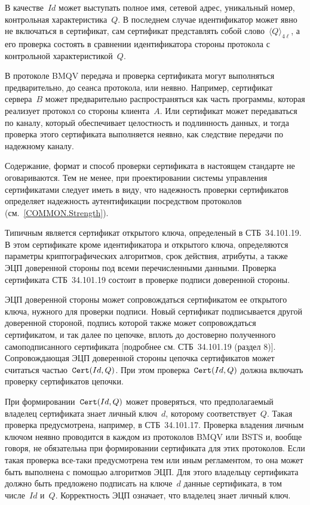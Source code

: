 \begin{note}
В качестве~$Id$ может выступать полное имя, сетевой адрес, уникальный номер,
контрольная характеристика~$Q$.
%
В последнем случае идентификатор может явно не включаться в сертификат, сам
сертификат представлять собой слово~$\langle Q\rangle_{4\ell}$, а его проверка
состоять в сравнении идентификатора стороны протокола с контрольной
характеристикой~$Q$.
\end{note}

В протоколе BMQV передача и проверка сертификата могут выполняться
предварительно, до сеанса протокола, или неявно.
%
Например, сертификат сервера~$B$ может предварительно распространяться как часть
программы, которая реализует протокол со стороны клиента~$A$.
%
Или сертификат может передаваться по каналу, который обеспечивает целостность и
подлинность данных, и тогда проверка этого сертификата выполняется неявно, как
следствие передачи по надежному каналу.

Содержание, формат и способ проверки сертификата в настоящем стандарте не
оговариваются.
%
Тем не менее, при проектировании системы управления сертификатами следует иметь
в виду, что надежность проверки сертификатов определяет надежность
аутентификации посредством протоколов (см.~\ref{COMMON.Strength}).

Типичным является сертификат открытого ключа, определеный в СТБ~34.101.19. В
этом сертификате кроме идентификатора и открытого ключа, определяются параметры
криптографических алгоритмов, срок действия, атрибуты, а также ЭЦП доверенной
стороны под всеми перечисленными данными.
%
Проверка сертификата СТБ~34.101.19 состоит в проверке подписи доверенной
стороны.

\begin{note}
ЭЦП доверенной стороны может сопровождаться 
сертификатом ее открытого ключа, нужного для проверки 
подписи. Новый сертификат подписывается другой
доверенной стороной, подпись которой также может сопровождаться 
сертификатом, и так далее по цепочке, вплоть до достоверно 
полученного самоподписанного сертификата 
[подробнее см. СТБ~34.101.19 (раздел 8)].
%
Сопровождающая ЭЦП доверенной стороны цепочка сертификатов 
может считаться частью~$\texttt{Cert}(Id,Q)$.
При этом проверка~$\texttt{Cert}(Id,Q)$ должна вклю\-чать проверку 
сертификатов цепочки.
\end{note}

При формировании~$\texttt{Cert}(Id,Q)$ может проверяться, что предполагаемый владелец
сертификата знает личный ключ~$d$, которому соответствует~$Q$. Такая проверка
предусмотрена, например, в СТБ~34.101.17.
%
Проверка владения личным ключом неявно проводится в каждом из протоколов BMQV
или BSTS и, вообще говоря, не обязательна при формировании сертификата для этих
протоколов.
%
Если такая проверка все-таки предусмотрена тем или иным регламентом, то она
может быть выполнена с помощью алгоритмов ЭЦП. Для этого владельцу сертификата
должно быть предложено подписать на ключе~$d$ данные сертификата, в том
числе~$Id$ и~$Q$.
%
Корректность ЭЦП означает, что владелец знает личный ключ.

